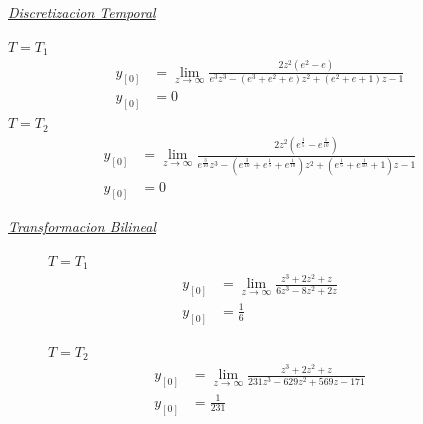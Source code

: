 \documentclass[a4paper,12pt]{report}
\begin{document}
\begin{enumerate}[label=\alph*), left=0pt]
                {\centering\underline{\textit{Discretizacion Temporal}}\par}
                $T = T_1$
                \begin{align*}
                    y_{[0]} &= \lim_{z \to \infty} \frac{2 z^2  (e^2 - e)}{e^3z^3-(e^3+e^2+e)z^2+(e^2+e+1)z-1}\\
                    y_{[0]} &= 0
                \end{align*}
                $T = T_2$
                \begin{align*}
                    y_{[0]} &= \lim_{z \to \infty} \frac{2 z^2 (e^{\frac{1}{5}} - e^{\frac{1}{10}})}
                        {e^{\frac{3}{10}}z^3 - (e^{\frac{3}{10}} + e^{\frac{1}{5}} + e^{\frac{1}{10}})z^2
                        + (e^{\frac{1}{5}} + e^{\frac{1}{10}} + 1)z - 1}\\
                    y_{[0]} &= 0
                \end{align*}

                {\centering\underline{\textit{Transformacion Bilineal}}\par}
                \begin{figure}[h!]
                    \centering
                    \begin{minipage}{0.4\textwidth}
                        \centering
                        $T = T_1$
                        \begin{align*}
                            y_{[0]} &= \lim_{z \to \infty} \frac{z^3 + 2z^2 + z}{6z^3 - 8z^2 + 2z}\\
                            y_{[0]} &= \frac{1}{6}
                        \end{align*}
                    \end{minipage}
                    \hspace{0.5cm}
                    \begin{minipage}{0.4\textwidth}
                        \centering
                        $T = T_2$
                        \begin{align*}
                            y_{[0]} &= \lim_{z \to \infty} \frac{z^3 + 2z^2 + z}{231z^3 - 629z^2 + 569z - 171}\\
                            y_{[0]} &= \frac{1}{231}
                        \end{align*}
                    \end{minipage}
                \end{figure}


\end{enumerate}
\end{document}
